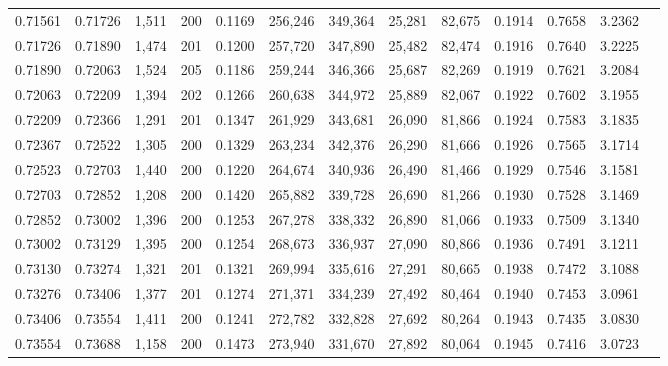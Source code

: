 \begin{tabular}{rrrrrrrrrrrrr}
0.71561 & 0.71726 & 1,511 & 200 &                                     0.1169 & 256,246 & 349,364 &  25,281 &  82,675 & 0.1914 & 0.7658 & 3.2362 \\
0.71726 & 0.71890 & 1,474 & 201 &                                     0.1200 & 257,720 & 347,890 &  25,482 &  82,474 & 0.1916 & 0.7640 & 3.2225 \\
0.71890 & 0.72063 & 1,524 & 205 &                                     0.1186 & 259,244 & 346,366 &  25,687 &  82,269 & 0.1919 & 0.7621 & 3.2084 \\
0.72063 & 0.72209 & 1,394 & 202 &                                     0.1266 & 260,638 & 344,972 &  25,889 &  82,067 & 0.1922 & 0.7602 & 3.1955 \\
0.72209 & 0.72366 & 1,291 & 201 &                                     0.1347 & 261,929 & 343,681 &  26,090 &  81,866 & 0.1924 & 0.7583 & 3.1835 \\
0.72367 & 0.72522 & 1,305 & 200 &                                     0.1329 & 263,234 & 342,376 &  26,290 &  81,666 & 0.1926 & 0.7565 & 3.1714 \\
0.72523 & 0.72703 & 1,440 & 200 &                                     0.1220 & 264,674 & 340,936 &  26,490 &  81,466 & 0.1929 & 0.7546 & 3.1581 \\
0.72703 & 0.72852 & 1,208 & 200 &                                     0.1420 & 265,882 & 339,728 &  26,690 &  81,266 & 0.1930 & 0.7528 & 3.1469 \\
0.72852 & 0.73002 & 1,396 & 200 &                                     0.1253 & 267,278 & 338,332 &  26,890 &  81,066 & 0.1933 & 0.7509 & 3.1340 \\
0.73002 & 0.73129 & 1,395 & 200 &                                     0.1254 & 268,673 & 336,937 &  27,090 &  80,866 & 0.1936 & 0.7491 & 3.1211 \\
0.73130 & 0.73274 & 1,321 & 201 &                                     0.1321 & 269,994 & 335,616 &  27,291 &  80,665 & 0.1938 & 0.7472 & 3.1088 \\
0.73276 & 0.73406 & 1,377 & 201 &                                     0.1274 & 271,371 & 334,239 &  27,492 &  80,464 & 0.1940 & 0.7453 & 3.0961 \\
0.73406 & 0.73554 & 1,411 & 200 &                                     0.1241 & 272,782 & 332,828 &  27,692 &  80,264 & 0.1943 & 0.7435 & 3.0830 \\
0.73554 & 0.73688 & 1,158 & 200 &                                     0.1473 & 273,940 & 331,670 &  27,892 &  80,064 & 0.1945 & 0.7416 & 3.0723 \\

\end{tabular}
